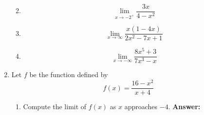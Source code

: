 \documentclass[fleqn,12pt]{article}
\newcommand{\<}{\ensuremath{\langle}}
\renewcommand{\>}{\ensuremath{\rangle}}
\begin{document}
\begin{enumerate}
\begin{enumerate}[{\it i.}]
        \bigskip

      \item 
        \label{item:2ii}
        \[
        \lim_{x\rightarrow -2^+} \frac{3x}{4-x^2}
        \]

        \bigskip

      \item 
        \label{item:2ii}
        \[
        \lim_{x \rightarrow \infty}\frac{x(1-4x)}{2x^2 - 7x +1}
        \]

        \bigskip

      \item 
        \label{item:2iii}
        \[
        \lim_{x \rightarrow -\infty}\frac{8x^5 + 3}{7x^3 - x}
        \]


      \end{enumerate}


\vskip2cm

    \item
      \label{item:3} 
      Let $f$ be the function defined by
      \[
      f(x) = \frac{16-x^2}{x+4}
      \]

      \bigskip

      \begin{enumerate}[{\it i.}]
      \item Compute the limit of $f(x)$ as $x$ approaches $-4$.
        \hfill {\bf Answer:} \underline{\phantom{XXXXXXX}}


\end{enumerate}
\end{enumerate}
\end{document}
